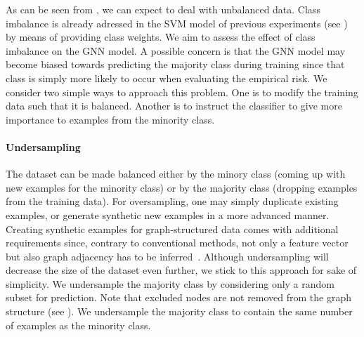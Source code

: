 \documentclass[
	fontsize=10pt, %
	twoside=true, %
	secnumdepth=1, %
  toc=indentunnumbered %
]{kaobook}
\begin{document}


As can be seen from , we can expect to deal with unbalanced
data. Class imbalance is already adressed in the SVM model of previous
experiments (see ) by means of providing class
weights. We aim to assess the effect of class imbalance on the GNN model.
A possible concern is that the GNN model may become biased towards predicting
the majority class during training since that class is simply more likely to occur when
evaluating the empirical risk.
%
We consider two simple ways to approach this problem. One is to modify the
training data such that it is balanced. Another is to instruct the classifier to
give more importance to examples from the minority class.



\paragraph{Undersampling}
The dataset can be made balanced 
either by  the minory class (coming up with new examples for
the minority class) or by  the majority class (dropping
examples from the training data).
For oversampling, one may simply duplicate existing examples, or generate
synthetic new examples in a more advanced manner. Creating synthetic examples
for graph-structured data comes with additional requirements since, contrary to
conventional methods, not only a feature vector but also graph adjacency has to
be inferred~\cite{zhao_GraphSMOTEImbalancedNode_2021}. Although undersampling
will decrease the size of the dataset even further, we stick to this approach
for sake of simplicity.
%
We undersample the majority class by considering only a random subset for
prediction. Note that excluded nodes are not removed from the graph structure (see
). We undersample the majority class to contain
the same number of examples as the minority class.
\end{document}
